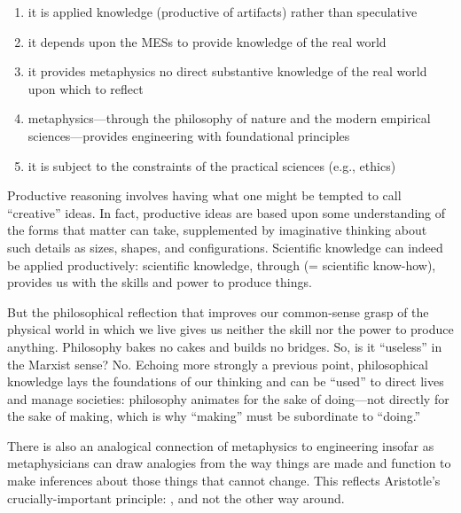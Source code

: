 \begin{enumerate}
\item it is applied knowledge (productive of artifacts) rather than speculative
\item it depends upon the MESs to provide knowledge of the real world
\item it provides metaphysics no direct substantive knowledge of the real world upon which to reflect
\item metaphysics---through the philosophy of nature and the modern empirical sciences---provides engineering with foundational principles
\item it is subject to the constraints of the practical sciences (e.g., ethics)
\end{enumerate}

Productive reasoning involves having what one might be tempted to call ``creative'' ideas. In fact, productive ideas are based upon some understanding of the forms that matter can take, supplemented by imaginative thinking about such details as sizes, shapes, and configurations. Scientific knowledge can indeed be applied productively: scientific knowledge, through  (= scientific know-how), provides us with the skills and power to produce things.

But the philosophical reflection that improves our common-sense grasp of the physical world in which we live gives us neither the skill nor the power to produce anything. Philosophy bakes no cakes and builds no bridges. So, is it ``useless'' in the Marxist sense? No. Echoing more strongly a previous point, philosophical knowledge lays the foundations of our thinking and can be ``used'' to direct lives and manage societies: philosophy animates for the sake of doing---not directly for the sake of making, which is why ``making'' must be subordinate to ``doing.''

There is also an analogical connection of metaphysics to engineering insofar as metaphysicians can draw analogies from the way things are made and function to make inferences about those things that cannot change. This reflects Aristotle's crucially-important principle: , and not the other way around.

